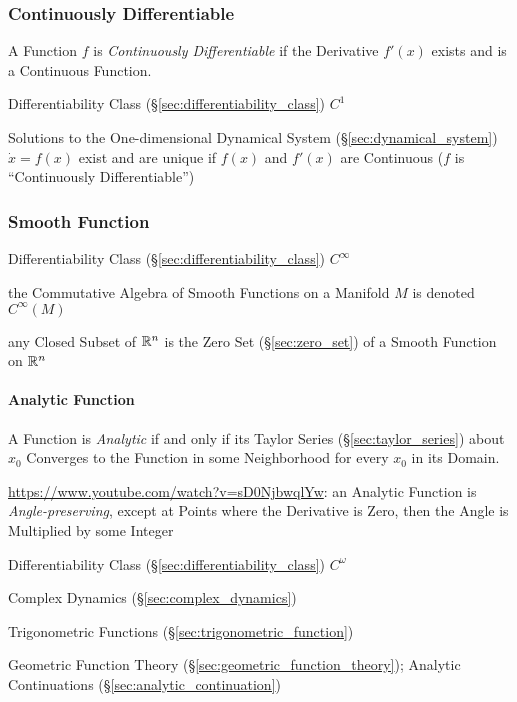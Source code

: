 \subsubsection{Continuously Differentiable}
\label{sec:continuously_differentiable}

A Function $f$ is \emph{Continuously Differentiable} if the Derivative $f'(x)$
exists and is a Continuous Function.

Differentiability Class (\S\ref{sec:differentiability_class}) $C^1$

Solutions to the One-dimensional Dynamical System
(\S\ref{sec:dynamical_system}) $\dot{x} = f(x)$ exist and are unique if $f(x)$
and $f'(x)$ are Continuous ($f$ is ``Continuously Differentiable'')



\subsubsection{Smooth Function}\label{sec:smooth_function}

Differentiability Class (\S\ref{sec:differentiability_class}) $C^{\infty}$

the Commutative Algebra of Smooth Functions on a Manifold $M$ is denoted
$C^\infty(M)$ %

any Closed Subset of $\mathbb{R}^n$ is the Zero Set (\S\ref{sec:zero_set}) of a
Smooth Function on $\mathbb{R}^n$



\paragraph{Analytic Function}\label{sec:analytic_function}\hfill

A Function is \emph{Analytic} if and only if its Taylor Series
(\S\ref{sec:taylor_series}) about $x_0$ Converges to the Function in some
Neighborhood for every $x_0$ in its Domain.

\url{https://www.youtube.com/watch?v=sD0NjbwqlYw}: an Analytic Function is
\emph{Angle-preserving}, except at Points where the Derivative is Zero, then the
Angle is Multiplied by some Integer

Differentiability Class (\S\ref{sec:differentiability_class}) $C^{\omega}$

Complex Dynamics (\S\ref{sec:complex_dynamics})

Trigonometric Functions (\S\ref{sec:trigonometric_function})

\fist Geometric Function Theory (\S\ref{sec:geometric_function_theory});
Analytic Continuations (\S\ref{sec:analytic_continuation})

